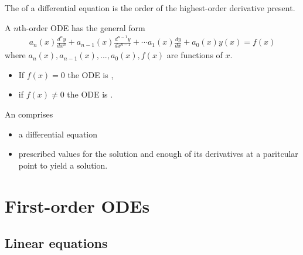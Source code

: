 \documentclass{article}
\begin{document}
\begin{definition}
    The  of a differential equation is the order of the highest-order derivative present.
\end{definition}

\begin{definition}
    A $n$th-order  ODE has the general form
    \begin{align*}
        a_n(x) \frac{d^ny}{dx^n}+a_{n-1}(x)\frac{d^{n-1}y}{dx^{n-1}}+\cdots a_1(x)\frac{dy}{dx}+a_0(x)y(x)= f(x)
    \end{align*}
    where $a_n(x), a_{n-1}(x), ..., a_0(x), f(x)$ are functions of $x$.
    \begin{itemize}
        \item If $f(x)=0$ the ODE is ,
        \item if $f(x)\not=0$ the ODE is .
    \end{itemize}
\end{definition}

\begin{definition}
    An  comprises
    \begin{itemize}
        \item a differential equation
        \item prescribed values for the solution and enough of its derivatives at a paritcular point to yield a solution.
    \end{itemize}
\end{definition}



\section{First-order ODEs}



\setcounter{subsection}{1}
\subsection{Linear equations}
\end{document}
